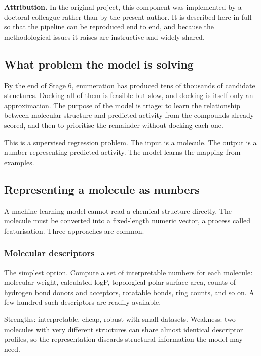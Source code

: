 \documentclass[11pt,a4paper]{article}
\begin{document}
\begin{keybox}
\textbf{Attribution.} In the original project, this component was implemented by
a doctoral colleague rather than by the present author. It is described here in
full so that the pipeline can be reproduced end to end, and because the
methodological issues it raises are instructive and widely shared.
\end{keybox}

\subsection{What problem the model is solving}

By the end of Stage 6, enumeration has produced tens of thousands of candidate
structures. Docking all of them is feasible but slow, and docking is itself only
an approximation. The purpose of the model is triage: to learn the relationship
between molecular structure and predicted activity from the compounds already
scored, and then to prioritise the remainder without docking each one.

This is a supervised regression problem. The input is a molecule. The output is
a number representing predicted activity. The model learns the mapping from
examples.

\subsection{Representing a molecule as numbers}

A machine learning model cannot read a chemical structure directly. The molecule
must be converted into a fixed-length numeric vector, a process called
featurisation. Three approaches are common.

\subsubsection{Molecular descriptors}

The simplest option. Compute a set of interpretable numbers for each molecule:
molecular weight, calculated logP, topological polar surface area, counts of
hydrogen bond donors and acceptors, rotatable bonds, ring counts, and so on. A
few hundred such descriptors are readily available.

Strengths: interpretable, cheap, robust with small datasets. Weakness: two
molecules with very different structures can share almost identical descriptor
profiles, so the representation discards structural information the model may
need.
\end{document}
